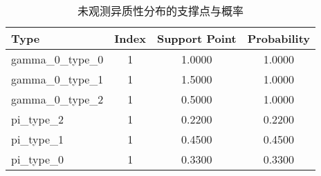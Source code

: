 \begin{table}[htbp]
\centering
\caption{未观测异质性分布的支撑点与概率}
\begin{tabular}{lccc}
\toprule
Type & Index & Support Point & Probability \\
\midrule
gamma_0_type_0 & 1 & 1.0000 & 1.0000 \\
gamma_0_type_1 & 1 & 1.5000 & 1.0000 \\
gamma_0_type_2 & 1 & 0.5000 & 1.0000 \\
pi_type_2 & 1 & 0.2200 & 0.2200 \\
pi_type_1 & 1 & 0.4500 & 0.4500 \\
pi_type_0 & 1 & 0.3300 & 0.3300 \\
\bottomrule
\end{tabular}
\end{table}

